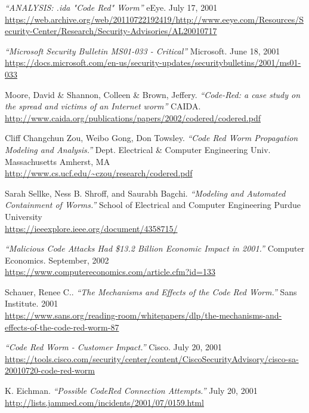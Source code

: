 \newpage
\begin{thebibliography}{99}

\emph{``ANALYSIS: .ida "Code Red" Worm''}
eEye. July 17, 2001\\
\url{https://web.archive.org/web/20110722192419/http://www.eeye.com/Resources/Security-Center/Research/Security-Advisories/AL20010717}

\emph{``Microsoft Security Bulletin MS01-033 - Critical''}
Microsoft. June 18, 2001\\
\url{https://docs.microsoft.com/en-us/security-updates/securitybulletins/2001/ms01-033}

 Moore, David \& Shannon, Colleen \& Brown, Jeffery. 
\emph{``Code-Red: a case study on the spread and victims of an Internet worm''}
CAIDA.\\
\url{http://www.caida.org/publications/papers/2002/codered/codered.pdf}

 Cliff Changchun Zou, Weibo Gong, Don Towsley.
\emph{``Code Red Worm Propagation Modeling and Analysis.''}
Dept. Electrical \& Computer Engineering Univ. Massachusetts Amherst, MA\\
\url{http://www.cs.ucf.edu/~czou/research/codered.pdf}

 Sarah Sellke, Ness B. Shroff, and Saurabh Bagchi.
\emph{``Modeling and Automated Containment of Worms.''}
School of Electrical and Computer Engineering Purdue University\\
\url{https://ieeexplore.ieee.org/document/4358715/}

\emph{``Malicious Code Attacks Had \$13.2 Billion Economic Impact in 2001.''}
Computer Economics. September, 2002\\
\url{https://www.computereconomics.com/article.cfm?id=133}

 Schauer, Renee C..
\emph{``The Mechanisms and Effects of the Code Red Worm.''}
Sans Institute. 2001\\
\url{https://www.sans.org/reading-room/whitepapers/dlp/the-mechanisms-and-effects-of-the-code-red-worm-87}

\emph{``Code Red Worm - Customer Impact.''}
Cisco. July 20, 2001\\
\url{https://tools.cisco.com/security/center/content/CiscoSecurityAdvisory/cisco-sa-20010720-code-red-worm}

 K. Eichman.
\emph{``Possible CodeRed Connection Attempts.''}
July 20, 2001\\
\url{http://lists.jammed.com/incidents/2001/07/0159.html}


\end{thebibliography}
